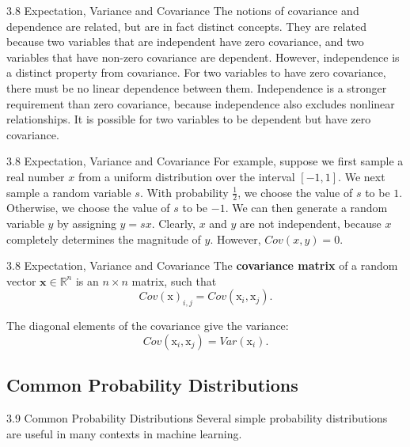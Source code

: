 \begin{frame}{3.8 Expectation, Variance and Covariance}
    \justifying
    The notions of covariance and dependence are related, but are in fact distinct concepts. They are related because two variables that are independent have zero covariance, and two variables that have non-zero covariance are dependent. However, independence is a distinct property from covariance. For two variables to have zero covariance, there must be no linear dependence between them. Independence is a stronger requirement than zero covariance, because independence also excludes nonlinear relationships. It is possible for two variables to be dependent but have zero covariance.
\end{frame}

\begin{frame}{3.8 Expectation, Variance and Covariance}
    \justifying
    For example, suppose we first sample a real number $x$ from a uniform distribution over the interval $[−1, 1]$. We next sample a random variable $s$. With probability $\frac{1}{2}$, we choose the value of $s$ to be $1$. Otherwise, we choose the value of $s$ to be $−1$. We can then generate a random variable $y$ by assigning $y = sx$. Clearly, $x$ and $y$ are not independent, because $x$ completely determines the magnitude of $y$. However, $Cov(x, y) = 0$.
\end{frame}

\begin{frame}{3.8 Expectation, Variance and Covariance}
    \justifying    
    The \textbf{covariance matrix} of a random vector $\boldsymbol{x} \in \mathbb{R}^{n}$ is an $n \times n$ matrix, such that
    \begin{equation}
        Cov(\boldsymbol{\mathrm{x}})_{i, j} = Cov(\mathrm{x}_{i}, \mathrm{x}_{j}).
        \label{eq:3_14}
    \end{equation}
    
    The diagonal elements of the covariance give the variance:
    \begin{equation}
        Cov(\mathrm{x}_{i}, \mathrm{x}_{j}) = Var(\mathrm{x}_{i}).
        \label{eq:3_15}
    \end{equation}{}
\end{frame}


\subsection{Common Probability Distributions}
\begin{frame}{3.9 Common Probability Distributions}
    \justifying
    Several simple probability distributions are useful in many contexts in machine learning.
\end{frame}

